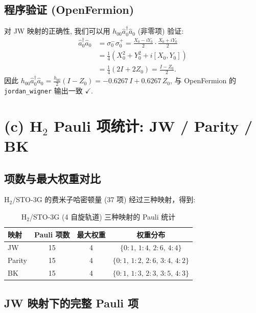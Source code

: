 \documentclass[fontset=mac]{ctexart}
\newcommand{\adag}[1]{\hat{a}_{#1}^\dagger}
\newcommand{\aop}[1]{\hat{a}_{#1}}
\newcommand{\Xop}{X}
\newcommand{\Yop}{Y}
\newcommand{\Zop}{Z}
\begin{document}
\subsection*{程序验证 (OpenFermion)}

对 JW 映射的正确性, 我们可以用 $h_{00}\adag{0}\aop{0}$ (非零项) 验证:
\begin{align}
    \adag{0} \aop{0} &= \sigma_0^- \sigma_0^+
                      = \frac{\Xop_0 - i\Yop_0}{2} \cdot \frac{\Xop_0 + i\Yop_0}{2} \nonumber \\
                      &= \frac{1}{4}(\Xop_0^2 + \Yop_0^2 + i[\Xop_0,\Yop_0]) \nonumber \\
                      &= \frac{1}{4}(2I + 2\Zop_0)
                      = \frac{I - \Zop_0}{2}.
\end{align}
因此 $h_{00}\adag{0}\aop{0} = \frac{h_{00}}{2}(I - \Zop_0) = -0.6267\,I + 0.6267\,\Zop_0$,
与 OpenFermion 的 \texttt{jordan\_wigner} 输出一致 $\checkmark$.

\section*{(c) H$_2$ Pauli 项统计: JW / Parity / BK}

\subsection*{项数与最大权重对比}

H$_2$/STO-3G 的费米子哈密顿量 (37 项) 经过三种映射，得到:

\begin{table}[H]
\centering
\begin{tabular}{lccc}
\toprule
\textbf{映射} & \textbf{Pauli 项数} & \textbf{最大权重} & \textbf{权重分布} \\
\midrule
JW     & 15 & 4 & $\{0{:}1,\,1{:}4,\,2{:}6,\,4{:}4\}$ \\
Parity & 15 & 4 & $\{0{:}1,\,1{:}2,\,2{:}6,\,3{:}4,\,4{:}2\}$ \\
BK     & 15 & 4 & $\{0{:}1,\,1{:}3,\,2{:}3,\,3{:}5,\,4{:}3\}$ \\
\bottomrule
\end{tabular}
\caption{H$_2$/STO-3G (4 自旋轨道) 三种映射的 Pauli 统计}
\end{table}

\subsection*{JW 映射下的完整 Pauli 项}
\end{document}

